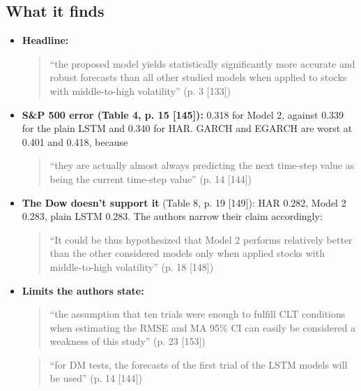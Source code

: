 \documentclass{article}
\begin{document}
\subsection{What it finds}

\begin{itemize}

\item \textbf{Headline:}

\begin{quote}``the proposed model yields statistically significantly more accurate and robust forecasts than all other studied models when applied to stocks with middle-to-high volatility'' (p. 3 [133])\end{quote}

\item \textbf{S\&P 500 error (Table 4, p. 15 [145]):} 0.318 for Model 2, against 0.339 for the plain LSTM and 0.340 for HAR. GARCH and EGARCH are worst at 0.401 and 0.418, because

\begin{quote}``they are actually almost always predicting the next time-step value as being the current time-step value'' (p. 14 [144])\end{quote}

\item \textbf{The Dow doesn't support it} (Table 8, p. 19 [149]): HAR 0.282, Model 2 0.283, plain LSTM 0.283. The authors narrow their claim accordingly:

\begin{quote}``It could be thus hypothesized that Model 2 performs relatively better than the other considered models only when applied stocks with middle-to-high volatility'' (p. 18 [148])\end{quote}

\item \textbf{Limits the authors state:}

\begin{quote}``the assumption that ten trials were enough to fulfill CLT conditions when estimating the RMSE and MA 95\% CI can easily be considered a weakness of this study'' (p. 23 [153])\end{quote}

\begin{quote}``for DM tests, the forecasts of the first trial of the LSTM models will be used'' (p. 14 [144])\end{quote}

\end{itemize}
\end{document}
